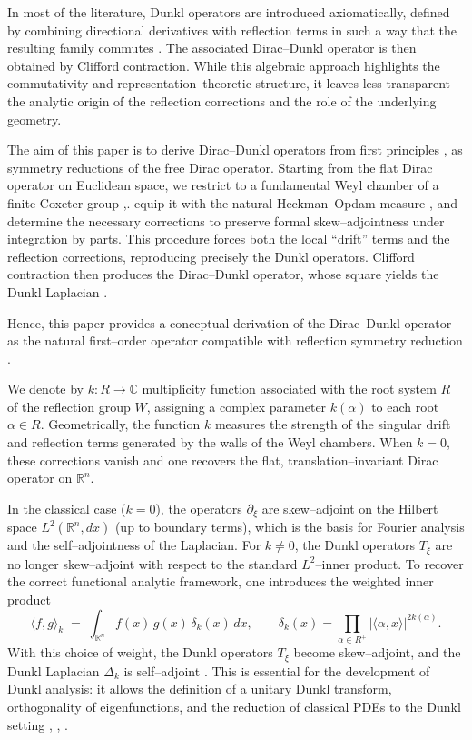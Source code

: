 \documentclass[12pt]{article}
\newcommand{\1}{\mathbbm{1}}
\theoremstyle{definition}
\begin{document}
In most of the literature, Dunkl operators are introduced axiomatically, defined by
combining directional derivatives with reflection terms in such a way that the resulting
family commutes \cite{Dunkl1989, DunklXu2001}. The associated Dirac--Dunkl operator is
then obtained by Clifford contraction. While this algebraic approach highlights the
commutativity and representation--theoretic structure, it leaves less transparent the
analytic origin of the reflection corrections and the role of the underlying geometry.

The aim of this paper is to derive Dirac--Dunkl operators {from first principles} \cite{heck1}, as
symmetry reductions of the free Dirac operator. Starting from the flat Dirac operator on
Euclidean space, we restrict to a fundamental Weyl chamber \cite{wall} of a finite Coxeter group \cite{Humphreys1990},\cite{Davis2008}.
equip it with the natural Heckman--Opdam measure \cite{HeckmanOpdam1987}, and determine
the necessary corrections to preserve formal skew--adjointness under integration by parts.
This procedure forces both the local ``drift'' terms and the reflection corrections,
reproducing precisely the Dunkl operators. Clifford contraction \cite{Lounesto2001} then produces the
Dirac--Dunkl operator, whose square yields the Dunkl Laplacian \cite{CastroSzarek2014}.



Hence, this paper provides a conceptual derivation of the Dirac--Dunkl operator as
the natural first--order operator compatible with reflection symmetry reduction \cite{etin1,etin2}. 

We denote by \(k : R \to \mathbb{C}\) {multiplicity function} associated with the
root system \(R\) of the reflection group \(W\), assigning a complex parameter \(k(\alpha)\)
to each root \(\alpha \in R\). Geometrically, the function \(k\) measures the strength of the
singular drift and reflection terms generated by the walls of the Weyl chambers.
When \(k=0\), these corrections vanish and one recovers the flat, translation--invariant
Dirac operator on \(\mathbb{R}^{n}\).

In the classical case ($k=0$), the operators $\partial_{\xi}$ are skew--adjoint
on the Hilbert space $L^2(\mathbb{R}^n,dx)$ (up to boundary terms), which is the
basis for Fourier analysis and the self--adjointness of the Laplacian. For $k \neq 0$, the Dunkl operators $T_{\xi}$ are no longer skew--adjoint with
respect to the standard $L^2$--inner product.  To recover the correct functional
analytic framework, one introduces the weighted inner product
\[
  \langle f,g \rangle_k \;=\; \int_{\mathbb{R}^n} f(x)\,\overline{g(x)}\,
  \delta_k(x)\,dx , \qquad
  \delta_k(x) = \prod_{\alpha \in R^+} |\langle \alpha, x \rangle|^{2k(\alpha)} .
\]
With this choice of weight, the Dunkl operators $T_{\xi}$ become skew--adjoint,
and the Dunkl Laplacian $\Delta_k$ is self--adjoint \cite{Dunkl1989}.  This is essential for the
development of Dunkl analysis: it allows the definition of a unitary Dunkl
transform, orthogonality of eigenfunctions, and the reduction of classical PDEs
to the Dunkl setting \cite{chere}, \cite{Dunkl3}, \cite{etin2}.
\end{document}
